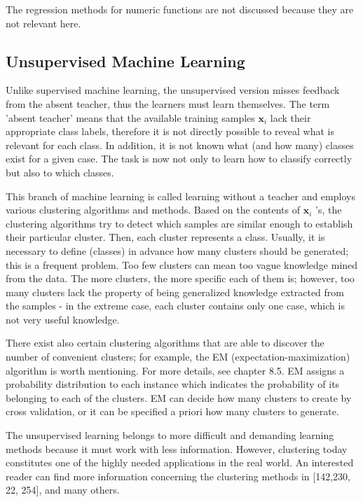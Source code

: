 \documentclass[11pt,openany,executivepaper]{book}
\begin{document}
The regression methods for numeric functions are not discussed because they are not relevant here.

\subsection{Unsupervised Machine Learning}
Unlike supervised machine learning, the unsupervised version misses feedback from the absent teacher, thus the learners must learn themselves. The term 'absent teacher' means that the available training samples $\mathbf{x}_{i}$ lack their appropriate class labels, therefore it is not directly possible to reveal what is relevant for each class. In addition, it is not known what (and how many) classes exist for a given case. The task is now not only to learn how to classify correctly but also to which classes.

This branch of machine learning is called learning without a teacher and employs various clustering algorithms and methods. Based on the contents of $\mathbf{x}_{i}$ 's, the clustering algorithms try to detect which samples are similar enough to establish their particular cluster. Then, each cluster represents a class. Usually, it is necessary to define (classes) in advance how many clusters should be generated; this is a frequent problem. Too few clusters can mean too vague knowledge mined from the data. The more clusters, the more specific each of them is; however, too many clusters lack the property of being generalized knowledge extracted from the samples - in the extreme case, each cluster contains only one case, which is not very useful knowledge.

There exist also certain clustering algorithms that are able to discover the number of convenient clusters; for example, the EM (expectati\-on-maximizati\-on) algorithm is worth mentioning. For more details, see \cite{112} chapter 8.5. EM assigns a probability distribution to each instance which indicates the probability of its belonging to each of the clusters. EM can decide how many clusters to create by cross validation, or it can be specified a priori how many clusters to generate.

The unsupervised learning belongs to more difficult and demanding lear\-ning methods because it must work with less information. However, clustering today constitutes one of the highly needed applications in the real world. An interested reader can find more information concerning the clustering methods in [142,230, 22, 254], and many others.
\end{document}

